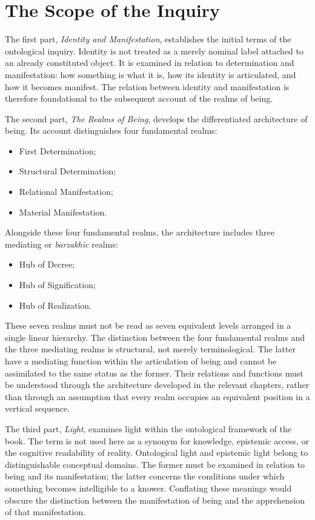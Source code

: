 \section*{The Scope of the Inquiry}

The first part, \textit{Identity and Manifestation}, establishes
the initial terms of the ontological inquiry. Identity is not
treated as a merely nominal label attached to an already
constituted object. It is examined in relation to determination
and manifestation: how something is what it is, how its identity
is articulated, and how it becomes manifest. The relation
between identity and manifestation is therefore foundational
to the subsequent account of the realms of being.

The second part, \textit{The Realms of Being}, develops the
differentiated architecture of being. Its account distinguishes
four fundamental realms:

\begin{itemize}
    \item First Determination;
    \item Structural Determination;
    \item Relational Manifestation;
    \item Material Manifestation.
\end{itemize}

Alongside these four fundamental realms, the architecture
includes three mediating or \textit{barzakhic} realms:

\begin{itemize}
    \item Hub of Decree;
    \item Hub of Signification;
    \item Hub of Realization.
\end{itemize}

These seven realms must not be read as seven equivalent levels
arranged in a single linear hierarchy. The distinction between
the four fundamental realms and the three mediating realms is
structural, not merely terminological. The latter have a
mediating function within the articulation of being and cannot
be assimilated to the same status as the former. Their relations
and functions must be understood through the architecture
developed in the relevant chapters, rather than through an
assumption that every realm occupies an equivalent position
in a vertical sequence.

The third part, \textit{Light}, examines light within the
ontological framework of the book. The term is not used here
as a synonym for knowledge, epistemic access, or the cognitive
readability of reality. Ontological light and epistemic light
belong to distinguishable conceptual domains. The former must
be examined in relation to being and its manifestation; the
latter concerns the conditions under which something becomes
intelligible to a knower. Conflating these meanings would
obscure the distinction between the manifestation of being
and the apprehension of that manifestation.

